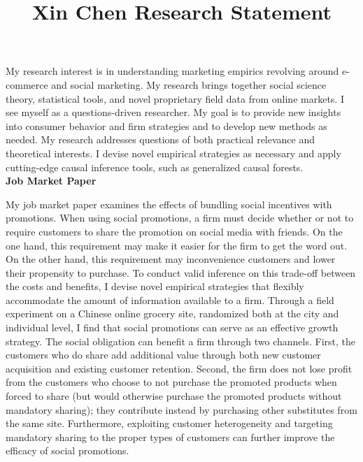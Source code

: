 \documentclass{article}
\begin{document}
\title{Xin Chen Research Statement}
\maketitle
\thispagestyle{fancy}
\noindent
\raggedright
My research interest is in understanding marketing empirics revolving around e-commerce and social marketing. My research brings together social science theory, statistical tools, and novel proprietary field data from online markets. I see myself as a questions-driven researcher. My goal is to provide new insights into consumer behavior and firm strategies and to develop new methods as needed. My research addresses questions of both practical relevance and theoretical interests. I devise novel empirical strategies as necessary and apply cutting-edge causal inference tools, such as generalized causal forests. \\
\vspace{1 cm}
\centering
\large
\textbf{Job Market Paper}\\
\normalsize
\noindent
\raggedright
My job market paper examines the effects of bundling social incentives with promotions. When using social promotions, a firm must decide whether or not to require customers to share the promotion on social media with friends. On the one hand, this requirement may make it easier for the firm to get the word out. On the other hand, this requirement may inconvenience customers and lower their propensity to purchase. To conduct valid inference on this trade-off between the costs and benefits, I devise novel empirical strategies that flexibly accommodate the amount of information available to a firm. Through a field experiment on a Chinese online grocery site, randomized both at the city and individual level, I find that social promotions can serve as an effective growth strategy. The social obligation can benefit a firm through two channels. First, the customers who do share add additional value through both new customer acquisition and existing customer retention. Second, the firm does not lose profit from the customers who choose to not purchase the promoted products when forced to share (but would otherwise purchase the promoted products without mandatory sharing); they contribute instead by purchasing other substitutes from the same site. Furthermore, exploiting customer heterogeneity and targeting mandatory sharing to the proper types of customers can further improve the efficacy of social promotions. \\
\vspace{1 cm}
\end{document}
